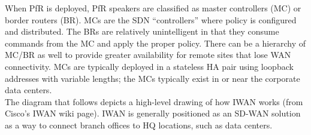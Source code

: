 When PfR is deployed, PfR speakers are classified as master controllers (MC)
or border routers (BR). MCs are the SDN ``controllers'' where policy is
configured and distributed. The BRs are relatively unintelligent in that they
consume commands from the MC and apply the proper policy. There can be a
hierarchy of MC/BR as well to provide greater availability for remote sites
that lose WAN connectivity. MCs are typically deployed in a stateless HA pair
using loopback addresses with variable lengths; the MCs typically exist in or
near the corporate data centers. \\

The diagram that follows depicts a high-level drawing of how IWAN works (from
Cisco’s IWAN wiki page). IWAN is generally positioned as an SD-WAN solution as
a way to connect branch offices to HQ locations, such as data centers.

